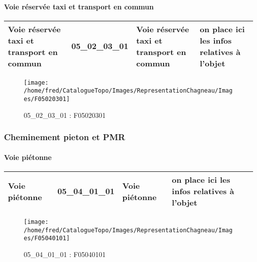 \documentclass[12pt,titlepage,oneside]{book}
\begin{document}
\paragraph{Voie réservée taxi et transport en commun}
\noindent
\vspace{\baselineskip}

\renewcommand{\arraystretch}{1.2}
\begin{supertabular}{|p{10cm}|c|p{13cm}|p{12cm}|}
 Voie réservée taxi et transport en commun & 05\_02\_03\_01 & Voie réservée taxi et transport en commun & on place ici les infos relatives à l'objet\\
\hline
\end{supertabular}
\begin{figure}[h!]
  \hfill         %
  \begin{minipage}[t]{3cm}
    \begin{center}
      \texttt{[image: /home/fred/CatalogueTopo/Images/RepresentationChagneau/Images/F05020301]}
      \caption[F05020301]{\label{} 05\_02\_03\_01 : F05020301}
    \end{center}
  \end{minipage}
\end{figure}

\subsubsection{\large Cheminement pieton et PMR}
\paragraph{Voie piétonne}
\noindent
\vspace{\baselineskip}

\renewcommand{\arraystretch}{1.2}
\begin{supertabular}{|p{10cm}|c|p{13cm}|p{12cm}|}
 Voie piétonne & 05\_04\_01\_01 & Voie piétonne & on place ici les infos relatives à l'objet\\
\hline
\end{supertabular}
\begin{figure}[h!]
  \hfill         %
  \begin{minipage}[t]{3cm}
    \begin{center}
      \texttt{[image: /home/fred/CatalogueTopo/Images/RepresentationChagneau/Images/F05040101]}
      \caption[F05040101]{\label{} 05\_04\_01\_01 : F05040101}
    \end{center}
  \end{minipage}
\end{figure}
\end{document}
